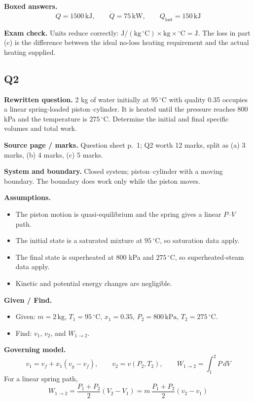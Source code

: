 \textbf{Boxed answers.}
\[
\boxed{Q=1500\,\mathrm{kJ},\qquad \dot Q=75\,\mathrm{kW},\qquad Q_{\text{lost}}=150\,\mathrm{kJ}}
\]

\textbf{Exam check.} Units reduce correctly: $\mathrm{J/(kg\,^{\circ}C)}\times\mathrm{kg}\times{}^\circ\mathrm{C}=\mathrm{J}$. The loss in part (c) is the difference between the ideal no-loss heating requirement and the actual heating supplied.

\subsection*{Q2}
\textbf{Rewritten question.} 2 kg of water initially at $95\,^\circ\mathrm{C}$ with quality 0.35 occupies a linear spring-loaded piston--cylinder. It is heated until the pressure reaches 800 kPa and the temperature is $275\,^\circ\mathrm{C}$. Determine the initial and final specific volumes and total work.

\textbf{Source page / marks.} Question sheet p.~1; Q2 worth 12 marks, split as (a) 3 marks, (b) 4 marks, (c) 5 marks.

\textbf{System and boundary.} Closed system; piston--cylinder with a moving boundary. The boundary does work only while the piston moves.

\textbf{Assumptions.}
\begin{itemize}
  \item The piston motion is quasi-equilibrium and the spring gives a linear $P$--$V$ path.
  \item The initial state is a saturated mixture at $95\,^\circ\mathrm{C}$, so saturation data apply.
  \item The final state is superheated at 800 kPa and $275\,^\circ\mathrm{C}$, so superheated-steam data apply.
  \item Kinetic and potential energy changes are negligible.
\end{itemize}

\textbf{Given / Find.}
\begin{itemize}
  \item Given: $m=2\,\mathrm{kg}$, $T_1=95\,^\circ\mathrm{C}$, $x_1=0.35$, $P_2=800\,\mathrm{kPa}$, $T_2=275\,^\circ\mathrm{C}$.
  \item Find: $v_1$, $v_2$, and $W_{1\to2}$.
\end{itemize}

\textbf{Governing model.}
\[
 v_1 = v_f + x_1(v_g-v_f),\qquad v_2 = v(P_2,T_2),\qquad W_{1\to2} = \int_1^2 P\,dV
\]
For a linear spring path,
\[
W_{1\to2}=\frac{P_1+P_2}{2}(V_2-V_1)=m\,\frac{P_1+P_2}{2}(v_2-v_1)
\]

